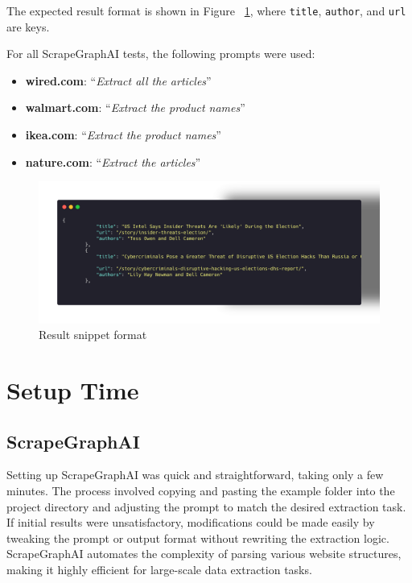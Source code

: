 The expected result format is shown in Figure ~\ref{fig:res-snippet}, where \texttt{title}, \texttt{author}, and \texttt{url} are keys.

For all ScrapeGraphAI tests, the following prompts were used:

\begin{itemize}
    \item \textbf{wired.com}: ``\textit{Extract all the articles}''
    \item \textbf{walmart.com}: ``\textit{Extract the product names}''
    \item \textbf{ikea.com}: ``\textit{Extract the product names}''
    \item \textbf{nature.com}: ``\textit{Extract the articles}''
\end{itemize}

\begin{figure}[h!]
    \centering
    \includegraphics[width=0.95\linewidth]{Assets/result.png}
    \caption{Result snippet format}
    \label{fig:res-snippet}
\end{figure}

\section{Setup Time}

\subsection{ScrapeGraphAI}
Setting up ScrapeGraphAI was quick and straightforward, taking only a few minutes. The process involved copying and pasting the example folder into the project directory and adjusting the prompt to match the desired extraction task. If initial results were unsatisfactory, modifications could be made easily by tweaking the prompt or output format without rewriting the extraction logic. ScrapeGraphAI automates the complexity of parsing various website structures, making it highly efficient for large-scale data extraction tasks.

